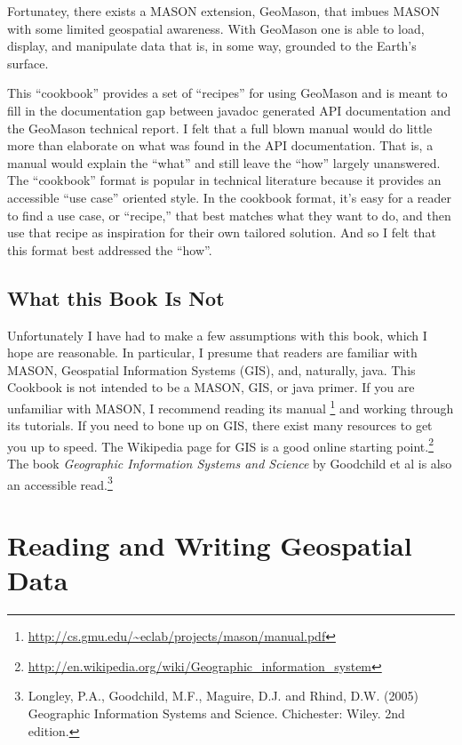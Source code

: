 \documentclass[twoside,10pt]{book}
\begin{document}
Fortunatey, there exists a MASON extension, GeoMason, that imbues
MASON with some limited geospatial awareness.  With GeoMason one is
able to load, display, and manipulate data that is, in some way,
grounded to the Earth's surface.

This ``cookbook'' provides a set of ``recipes'' for using GeoMason and is
meant to fill in the documentation gap between javadoc generated API
documentation and the GeoMason technical report.  I felt that a full
blown manual would do little more than elaborate on what was found in
the API documentation.  That is, a manual would explain the
``what'' and still leave the ``how'' largely unanswered.  The ``cookbook''
format is popular in technical literature because it provides an
accessible ``use case'' oriented style.  In the cookbook format, it's
easy for a reader to find a use case, or ``recipe,'' that best matches what
they want to do, and then use that recipe as inspiration for their own
tailored solution.  And so I felt that this format best addressed the ``how''.

\section{What this Book Is Not}

Unfortunately I have had to make a few assumptions with this book,
which I hope are reasonable.  In particular, I presume that readers
are familiar with MASON, Geospatial Information Systems (GIS), and,
naturally, java.  This Cookbook is not intended to be a MASON, GIS, or
java primer.  If you are unfamiliar with MASON, I recommend reading
its manual
\footnote{\url{http://cs.gmu.edu/~eclab/projects/mason/manual.pdf}}
and working through its tutorials.  If you need to bone up on GIS,
there exist many resources to get you up to speed.  The Wikipedia page
for GIS is a good online starting
point.\footnote{\url{http://en.wikipedia.org/wiki/Geographic_information_system}}
The book \emph{Geographic Information Systems and Science} by Goodchild et al is also an
accessible read.\footnote{Longley, P.A., Goodchild, M.F., Maguire,
  D.J. and Rhind, D.W. (2005) Geographic Information Systems and
  Science. Chichester: Wiley. 2nd edition.}



\chapter{Reading and Writing Geospatial Data}
\label{ch:io}
\end{document}
